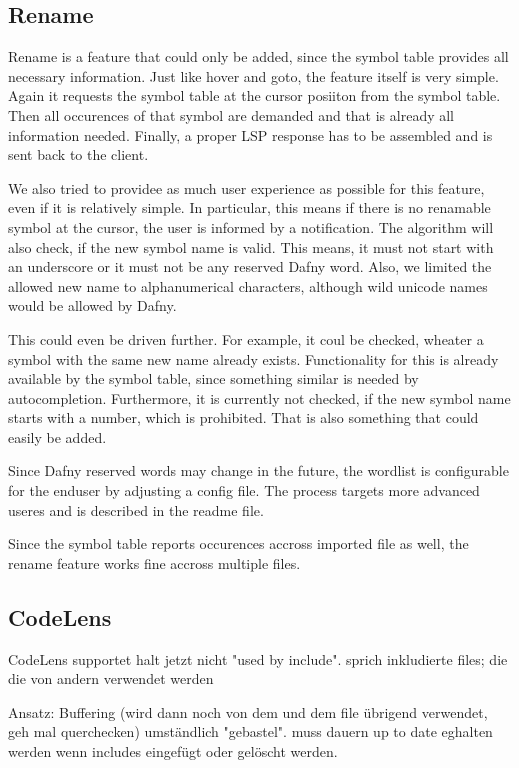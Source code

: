 \subsection{Rename}
Rename is a feature that could only be added, since the symbol table provides all necessary information.
Just like hover and goto, the feature itself is very simple.
Again it requests the symbol table at the cursor posiiton from the symbol table.
Then all occurences of that symbol are demanded and that is already all information needed.
Finally, a proper LSP response has to be assembled and is sent back to the client.

We also tried to providee as much user experience as possible for this feature, even if it is relatively simple.
In particular, this means if there is no renamable symbol at the cursor, the user is informed by a notification.
The algorithm will also check, if the new symbol name is valid.
This means, it must not start with an underscore or it must not be any reserved Dafny word.
Also, we limited the allowed new name to alphanumerical characters, although wild unicode names would be allowed by Dafny.

This could even be driven further. For example, it coul be checked, wheater a symbol with the same new name already exists.
Functionality for this is already available by the symbol table, since something similar is needed by autocompletion.
Furthermore, it is currently not checked, if the new symbol name starts with a number, which is prohibited.
That is also something that could easily be added. 

Since Dafny reserved words may change in the future, the wordlist is configurable for the enduser by adjusting a config file.
The process targets more advanced useres and is described in the readme file.

Since the symbol table reports occurences accross imported file as well, the rename feature works fine accross multiple files.



\subsection{CodeLens}

CodeLens supportet halt jetzt nicht "used by include".
sprich inkludierte files; die die von andern verwendet werden

Ansatz: Buffering (wird dann noch von dem und dem file übrigend verwendet, geh mal querchecken)
umständlich "gebastel". muss dauern up to date eghalten werden wenn includes eingefügt oder gelöscht werden.

